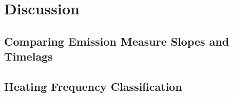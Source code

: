 \section{Discussion}\label{sec:discussion}




\subsection{Comparing Emission Measure Slopes and Timelags}

\subsection{Heating Frequency Classification}
